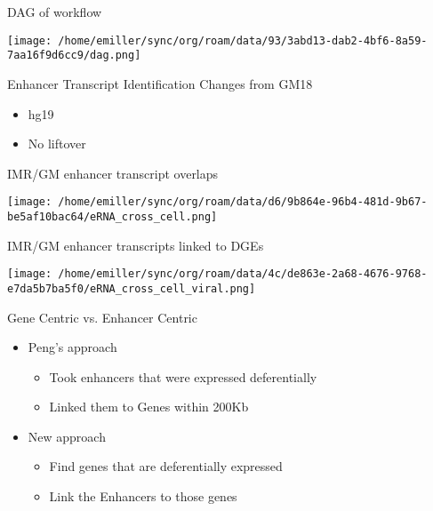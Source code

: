 \documentclass[bigger]{beamer}
\begin{document}
\begin{frame}[label={sec:orgcbf22da}]{DAG of workflow}
\begin{center}
\texttt{[image: /home/emiller/sync/org/roam/data/93/3abd13-dab2-4bf6-8a59-7aa16f9d6cc9/dag.png]}
\end{center}
\end{frame}

\begin{frame}[label={sec:org52c8e0d}]{Enhancer Transcript Identification}
Changes from GM18
\begin{itemize}
\item hg19
\item No liftover
\end{itemize}
\end{frame}

\begin{frame}[label={sec:orge1266a4}]{IMR/GM enhancer transcript overlaps}
\begin{center}
\texttt{[image: /home/emiller/sync/org/roam/data/d6/9b864e-96b4-481d-9b67-be5af10bac64/eRNA\_cross\_cell.png]}
\end{center}
\end{frame}

\begin{frame}[label={sec:org14f59c5}]{IMR/GM enhancer transcripts linked to DGEs}
\begin{center}
\texttt{[image: /home/emiller/sync/org/roam/data/4c/de863e-2a68-4676-9768-e7da5b7ba5f0/eRNA\_cross\_cell\_viral.png]}
\end{center}
\end{frame}

\begin{frame}[label={sec:org9e6577a}]{Gene Centric vs. Enhancer Centric}
\begin{itemize}
\item Peng's approach
\begin{itemize}
\item Took enhancers that were expressed deferentially
\item Linked them to Genes within 200Kb
\end{itemize}

\item New approach
\begin{itemize}
\item Find genes that are deferentially expressed
\item Link the Enhancers to those genes
\end{itemize}
\end{itemize}
\end{frame}
\end{document}
